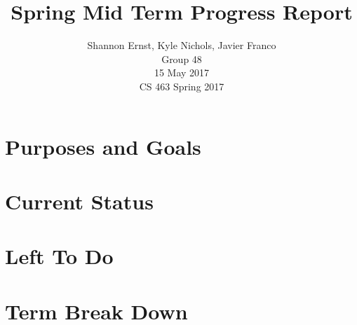 \documentclass[letterpaper,10pt,serif,draftclsnofoot,onecolumn,compsoc,titlepage]{IEEEtran}
\title{Spring Mid Term Progress Report}
\author{Shannon Ernst, Kyle Nichols, Javier Franco\\ Group 48 \\ 15 May 2017 \\ CS 463 Spring 2017}
\begin{document}
\maketitle
\begin{abstract}

\end{abstract}
\newpage
\tableofcontents
\newpage
\section{Purposes and Goals}
\section{Current Status}
\section{Left To Do}
\section{Term Break Down}
\end{document}
